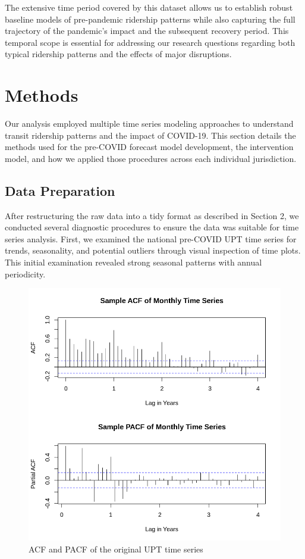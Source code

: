\documentclass[11pt]{article}
\begin{document}
The extensive time period covered by this dataset allows us to establish robust baseline models of pre-pandemic ridership patterns while also capturing the full trajectory of the pandemic's impact and the subsequent recovery period. This temporal scope is essential for addressing our research questions regarding both typical ridership patterns and the effects of major disruptions.

\section{Methods}

Our analysis employed multiple time series modeling approaches to understand transit ridership patterns and the impact of COVID-19. This section details the methods used for the pre-COVID forecast model development, the intervention model, and how we applied those procedures across each individual jurisdiction.

\subsection{Data Preparation}

After restructuring the raw data into a tidy format as described in Section 2, we conducted several diagnostic procedures to ensure the data was suitable for time series analysis. First, we examined the national pre-COVID UPT time series for trends, seasonality, and potential outliers through visual inspection of time plots. This initial examination revealed strong seasonal patterns with annual periodicity.

\begin{figure}[!ht]
\centering
\includegraphics[width=0.525\linewidth]{pre_acf_pacf.png}
\caption{ACF and PACF of the original UPT time series}
\label{f:acf_pacf_orig}
\end{figure}
\end{document}
